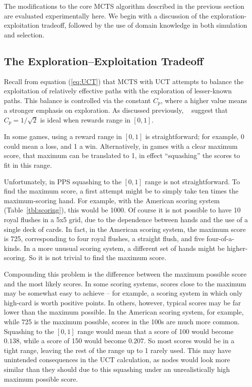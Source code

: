 \documentclass[letterpaper]{article}
\begin{document}
The modifications to the core MCTS algorithm described in the previous section are evaluated experimentally here. We begin with a discussion of the exploration-exploitation tradeoff, followed by the use of domain knowledge in both simulation and selection.

\subsection{The Exploration--Exploitation Tradeoff}
Recall from equation (\ref{eq:UCT}) that MCTS with UCT attempts to balance the exploitation of relatively effective paths with the exploration of lesser-known paths. This balance is controlled via the constant $C_p$, where a higher value means a stronger emphasis on exploration. As discussed previously, ~\cite{kocsis2006improved} suggest that $C_p = 1 / \sqrt{2}$ is ideal when rewards range in $[0,1]$. 

In some games, using a reward range in $[0,1]$ is straightforward; for example, 0 could mean a loss, and 1 a win. Alternatively, in games with a clear maximum score, that maximum can be translated to 1, in effect ``squashing'' the scores to fit in this range.

Unfortunately, in PPS squashing to the $[0,1]$ range is not straightforward. To find the maximum score, a first attempt might be to simply take ten times the maximum-scoring hand. For example, with the American scoring system (Table~\ref{tbl:scoring}), this would be 1000. Of course it is not possible to have 10 royal flushes in a 5x5 grid, due to the dependence between hands and the use of a single deck of cards. In fact, in the American scoring system, the maximum score is 725, corresponding to four royal flushes, a straight flush, and five four-of-a-kinds. In a more unusual scoring system, a different set of hands might be higher-scoring. So it is not trivial to find the maximum score.

Compounding this problem is the difference between the maximum possible score and the most likely scores. In some scoring systems, scores close to the maximum may be somewhat easy to achieve -- for example, a scoring system in which only high-card is worth positive points. In others, however, typical scores may be far lower than the maximum possible. In the American scoring system, for example, while 725 is the maximum possible, scores in the 100s are much more common. Squashing to the $[0,1]$ range would mean that a score of 100 would become $0.138$, while a score of 150 would become $0.207$. So most scores would be in a tight range, leaving the rest of the range up to 1 rarely used. This may have unintended consequences in the UCT calculation, as nodes would look more similar than they should due to this squashing under an unrealistically high maximum possible score.
\end{document}
